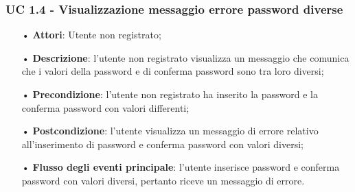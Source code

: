 \subsubsection{UC 1.4 - Visualizzazione messaggio errore password diverse}
\begin{itemize}
	\item[•]\textbf{Attori}: Utente non registrato;
	\item[•]\textbf{Descrizione}: l'utente non registrato visualizza un messaggio che comunica che i valori della password e di conferma password sono tra loro diversi;
	\item[•]\textbf{Precondizione}: l'utente non registrato ha inserito la password e la conferma password con valori differenti;
	\item[•]\textbf{Postcondizione}: l'utente visualizza un messaggio di errore relativo all'inserimento di password e conferma password con valori diversi;
	\item[•]\textbf{Flusso degli eventi principale}: l'utente inserisce password e conferma password con valori diversi, pertanto riceve un messaggio di errore.
\end{itemize}